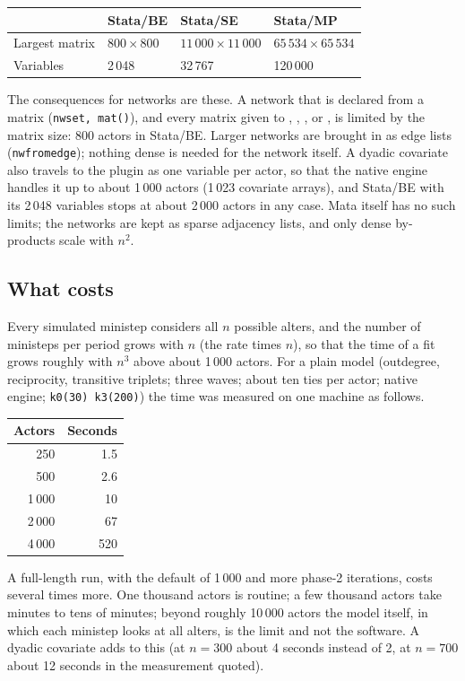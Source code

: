 \begin{center}
\small
\begin{tabular}{@{}llll@{}}
\toprule
 & Stata/BE & Stata/SE & Stata/MP \\
\midrule
Largest matrix & $800\times 800$ & $11\,000\times 11\,000$ & $65\,534\times 65\,534$ \\
Variables & 2\,048 & 32\,767 & 120\,000 \\
\bottomrule
\end{tabular}
\end{center}
 The consequences for networks are these. A network that is declared from a matrix (\texttt{nwset, mat()}), and every matrix given to , , ,  or , is limited by the matrix size: 800 actors in Stata/BE. Larger networks are brought in as edge lists (\texttt{nwfromedge}); nothing dense is needed for the network itself. A dyadic covariate also travels to the plugin as one variable per actor, so that the native engine handles it up to about 1\,000 actors (1\,023 covariate arrays), and Stata/BE with its 2\,048 variables stops at about 2\,000 actors in any case. Mata itself has no such limits; the networks are kept as sparse adjacency lists, and only dense by-products scale with $n^2$.

\subsection{What \nwsaom{} costs}

Every simulated ministep considers all $n$ possible alters, and the number of ministeps per period grows with $n$ (the rate times $n$), so that the time of a fit grows roughly with $n^3$ above about 1\,000 actors. For a plain model (outdegree, reciprocity, transitive triplets; three waves; about ten ties per actor; native engine; \texttt{k0(30) k3(200)}) the time was measured on one machine as follows.

\begin{center}
\small
\begin{tabular}{@{}rr@{}}
\toprule
Actors & Seconds \\
\midrule
250 & 1.5 \\
500 & 2.6 \\
1\,000 & 10 \\
2\,000 & 67 \\
4\,000 & 520 \\
\bottomrule
\end{tabular}
\end{center}
A full-length run, with the default  of 1\,000 and more phase-2 iterations, costs several times more. One thousand actors is routine; a few thousand actors take minutes to tens of minutes; beyond roughly 10\,000 actors the model itself, in which each ministep looks at all alters, is the limit and not the software. A dyadic covariate adds to this (at $n=300$ about 4 seconds instead of 2, at $n=700$ about 12 seconds in the measurement quoted).

